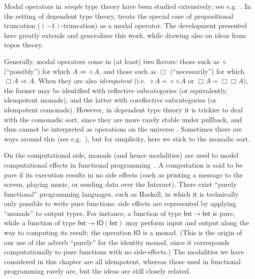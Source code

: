 Modal operators in \emph{simple} type theory have been studied extensively; see e.g.~\cite{modalTT}.  In the setting of dependent type theory, \cite{ab:bracket-types} treats the special case of propositional truncation ($(-1)$-truncation) as a modal operator.  The development presented here greatly extends and generalizes this work, while drawing also on ideas from topos theory.

Generally, modal operators come in (at least) two flavors: those such as $\diamond$ (``possibly'') for which $A\Rightarrow \diamond A$, and those such as $\Box$ (``necessarily'') for which $\Box A \Rightarrow A$.
When they are also \emph{idempotent} (i.e.\ $\diamond A = \diamond{\diamond A}$ or $\Box A = \Box{\Box A}$), the former may be identified with reflective subcategories (or equivalently, idempotent monads), and the latter with coreflective subcategories (or idempotent comonads).
However, in dependent type theory it is trickier to deal with the comonadic sort, since they are more rarely stable under pullback, and thus cannot be interpreted as operations on the universe \UU.
Sometimes there are ways around this (see e.g.~\cite{QGFTinCHoTT12}), but for simplicity, here we stick to the monadic sort.

On the computational side, monads (and hence modalities) are used to model computational effects in functional programming~\cite{Moggi89}.%
%
A computation is said to be \emph{pure} if its execution results in no side effects (such as printing a message to the screen, playing music, or sending data over the Internet).
There exist ``purely functional'' programming languages, such as Haskell, in which it is technically only possible to write pure functions: side effects are represented by applying ``monads'' to output types.
For instance, a function of type $\mathsf{Int}\to\mathsf{Int}$ is pure, while a function of type $\mathsf{Int}\to \mathsf{IO}(\mathsf{Int})$ may perform input and output along the way to computing its result; the operation $\mathsf{IO}$ is a monad.
%
(This is the origin of our use of the adverb ``purely'' for the identity monad, since it corresponds computationally to pure functions with no side-effects.)
The modalities we have considered in this chapter are all idempotent, whereas those used in functional programming rarely are, but the ideas are still closely related.



